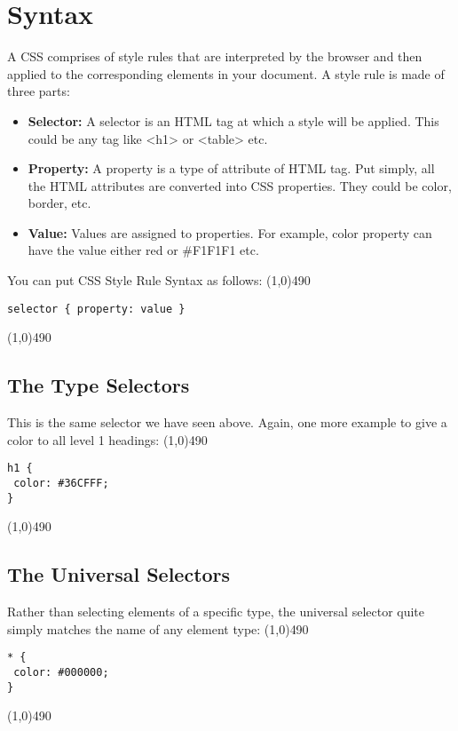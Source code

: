 \documentclass{report}
\begin{document}
    \section{\LARGE Syntax}
    \bigbreak \noindent 
    A CSS comprises of style rules that are interpreted by the browser and then
    applied to the corresponding elements in your document. A style rule is made of
    three parts:
    \begin{itemize}
        \item \textbf{Selector:} A selector is an HTML tag at which a style will be applied. This could be any tag like <h1> or <table> etc.
        \item \textbf{Property:} A property is a type of attribute of HTML tag. Put simply, all the HTML attributes are converted into CSS properties. They could be color, border, etc.
        \item \textbf{Value:} Values are assigned to properties. For example, color property can have the value either red or \#F1F1F1 etc.     
    \end{itemize}
    \bigbreak \noindent 
    You can put CSS Style Rule Syntax as follows:
    \line(1,0){490}
    \begin{verbatim}
selector { property: value }
    \end{verbatim}
    \line(1,0){490}

\bigbreak \noindent 
    \subsection{The Type Selectors}
    \bigbreak \noindent 
    This is the same selector we have seen above. Again, one more example to give a color to all level 1 headings:
    \bigbreak \noindent 
    \line(1,0){490}
    \begin{verbatim}
h1 {
 color: #36CFFF;
}
    \end{verbatim}
    \line(1,0){490}
    
    \bigbreak \noindent 
    \subsection{The Universal Selectors}
    \bigbreak \noindent 
    Rather than selecting elements of a specific type, the universal selector quite simply matches the name of any element type:
    \bigbreak \noindent 
    \line(1,0){490}
    \begin{verbatim}
* {
 color: #000000;
}
    \end{verbatim}
    \line(1,0){490}
\end{document}
